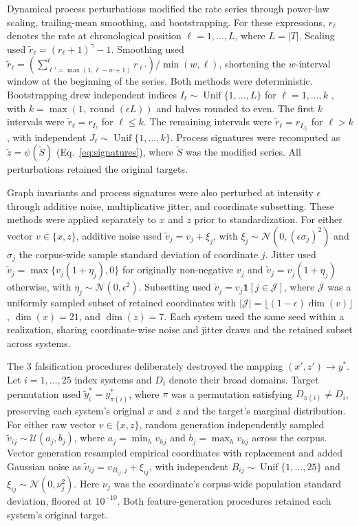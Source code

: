 \documentclass{article}
\begin{document}
Dynamical process perturbations modified the rate series through power-law scaling, trailing-mean smoothing, and bootstrapping. For these expressions, $r_{\ell}$ denotes the rate at chronological position $\ell = 1, \ldots, L$, where $L = \lvert T \rvert$. Scaling used $\widetilde{r}_{\ell} = (r_{\ell} + 1)^{\gamma} - 1$. Smoothing used $\widetilde{r}_{\ell} = (\sum_{\ell'=\max(1,\ell-w+1)}^{\ell} r_{\ell'})/\min(w,\ell)$, shortening the $w$-interval window at the beginning of the series. Both methods were deterministic. Bootstrapping drew independent indices $I_{\ell} \sim \operatorname{Unif}\{1, \ldots, L\}$ for $\ell = 1, \ldots, k$ \citep{ref75}, with $k = \max(1, \operatorname{round}(\epsilon L))$ and halves rounded to even. The first $k$ intervals were $\widetilde{r}_{\ell} = r_{I_{\ell}}$ for $\ell \le k$. The remaining intervals were $\widetilde{r}_{\ell} = r_{I_{J_{\ell}}}$ for $\ell > k$, with independent $J_{\ell} \sim \operatorname{Unif}\{1, \ldots, k\}$. Process signatures were recomputed as $\widetilde{z} = \psi(\widetilde{S})$ (Eq.~\eqref{eq:signatures}), where $\widetilde{S}$ was the modified series. All perturbations retained the original targets.

Graph invariants and process signatures were also perturbed at intensity $\epsilon$ through additive noise, multiplicative jitter, and coordinate subsetting. These methods were applied separately to $x$ and $z$ prior to standardization. For either vector $v \in \{x, z\}$, additive noise used $\widetilde{v}_j = v_j + \xi_j$, with $\xi_j \sim \mathcal{N}(0, (\epsilon\sigma_j)^2)$ and $\sigma_j$ the corpus-wide sample standard deviation of coordinate $j$. Jitter used $\widetilde{v}_j = \max\{v_j(1 + \eta_j), 0\}$ for originally non-negative $v_j$ and $\widetilde{v}_j = v_j(1 + \eta_j)$ otherwise, with $\eta_j \sim \mathcal{N}(0, \epsilon^2)$. Subsetting used $\widetilde{v}_j = v_j\mathbf{1}[j \in \mathcal{J}]$, where $\mathcal{J}$ was a uniformly sampled subset of retained coordinates with $\lvert \mathcal{J} \rvert = \lfloor (1 - \epsilon)\dim(v) \rfloor$, $\dim(x) = 21$, and $\dim(z) = 7$. Each system used the same seed within a realization, sharing coordinate-wise noise and jitter draws and the retained subset across systems.

The 3 falsification procedures deliberately destroyed the mapping $(x', z') \to y^*$. Let $i = 1, \ldots, 25$ index systems and $D_i$ denote their broad domains. Target permutation used $\widetilde{y}_i^{*} = y_{\pi(i)}^{*}$, where $\pi$ was a permutation satisfying $D_{\pi(i)} \ne D_i$, preserving each system's original $x$ and $z$ and the target's marginal distribution. For either raw vector $v \in \{x, z\}$, random generation independently sampled $\widetilde{v}_{ij} \sim \mathcal{U}(a_j, b_j)$, where $a_j = \min_h v_{hj}$ and $b_j = \max_h v_{hj}$ across the corpus. Vector generation resampled empirical coordinates with replacement \citep{ref75} and added Gaussian noise as $\widetilde{v}_{ij} = v_{B_{ij},j} + \xi_{ij}$, with independent $B_{ij} \sim \operatorname{Unif}\{1, \ldots, 25\}$ and $\xi_{ij} \sim \mathcal{N}(0, \nu_j^2)$. Here $\nu_j$ was the coordinate's corpus-wide population standard deviation, floored at $10^{-10}$. Both feature-generation procedures retained each system's original target.
\end{document}

